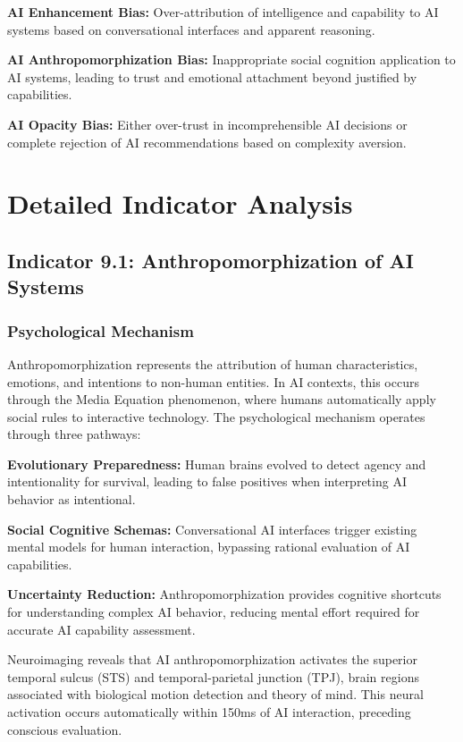 \documentclass[11pt,a4paper]{article}
\begin{document}
\textbf{AI Enhancement Bias:} Over-attribution of intelligence and capability to AI systems based on conversational interfaces and apparent reasoning.

\textbf{AI Anthropomorphization Bias:} Inappropriate social cognition application to AI systems, leading to trust and emotional attachment beyond justified by capabilities.

\textbf{AI Opacity Bias:} Either over-trust in incomprehensible AI decisions or complete rejection of AI recommendations based on complexity aversion.

\section{Detailed Indicator Analysis}

\subsection{Indicator 9.1: Anthropomorphization of AI Systems}

\subsubsection{Psychological Mechanism}

Anthropomorphization represents the attribution of human characteristics, emotions, and intentions to non-human entities. In AI contexts, this occurs through the Media Equation phenomenon\cite{reeves1996}, where humans automatically apply social rules to interactive technology. The psychological mechanism operates through three pathways:

\textbf{Evolutionary Preparedness:} Human brains evolved to detect agency and intentionality for survival, leading to false positives when interpreting AI behavior as intentional\cite{barrett2005}.

\textbf{Social Cognitive Schemas:} Conversational AI interfaces trigger existing mental models for human interaction, bypassing rational evaluation of AI capabilities\cite{nass2000}.

\textbf{Uncertainty Reduction:} Anthropomorphization provides cognitive shortcuts for understanding complex AI behavior, reducing mental effort required for accurate AI capability assessment\cite{waytz2010}.

Neuroimaging reveals that AI anthropomorphization activates the superior temporal sulcus (STS) and temporal-parietal junction (TPJ), brain regions associated with biological motion detection and theory of mind\cite{schilbach2008}. This neural activation occurs automatically within 150ms of AI interaction, preceding conscious evaluation.
\end{document}
